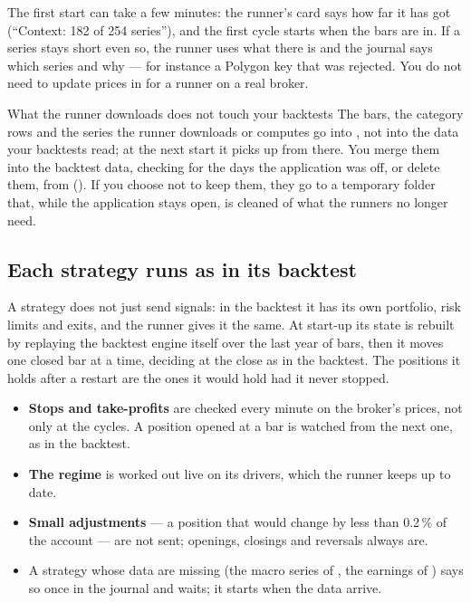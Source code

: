 \noindent
The first start can take a few minutes: the runner's card says how far it
has got (\enquote{Context: 182 of 254 series}), and the first cycle starts
when the bars are in. If a series stays short even so, the runner uses what
there is and the journal says which series and why --- for instance a
Polygon key that was rejected. You do not need to update prices in
 for a runner on a real broker.

\begin{nota}{What the runner downloads does not touch your backtests}
The bars, the category rows and the series the runner downloads or computes
go into , not into the data your backtests read; at the next
start it picks up from there. You merge them into the backtest data, checking
for the days the application was off, or delete them, from
 ().
If you choose not to keep them, they go to a temporary folder that, while the
application stays open, is cleaned of what the runners no longer need.
\end{nota}

\subsection{Each strategy runs as in its backtest}

A strategy does not just send signals: in the backtest it has its own
portfolio, risk limits and exits, and the runner gives it the same. At
start-up its state is rebuilt by replaying the backtest engine itself over
the last year of bars, then it moves one closed bar at a time, deciding at
the close as in the backtest. The positions it holds after a restart are the
ones it would hold had it never stopped.

\begin{itemize}
  \item \textbf{Stops and take-profits} are checked every minute on the
        broker's prices, not only at the cycles. A position opened at a bar
        is watched from the next one, as in the backtest.
  \item \textbf{The regime} is worked out live on its drivers, which the
        runner keeps up to date.
  \item \textbf{Small adjustments} --- a position that would change by less
        than \num{0.2}\,\% of the account --- are not sent; openings,
        closings and reversals always are.
  \item A strategy whose data are missing (the macro series of
        , the earnings of ) says so
        once in the journal and waits; it starts when the data arrive.
\end{itemize}

